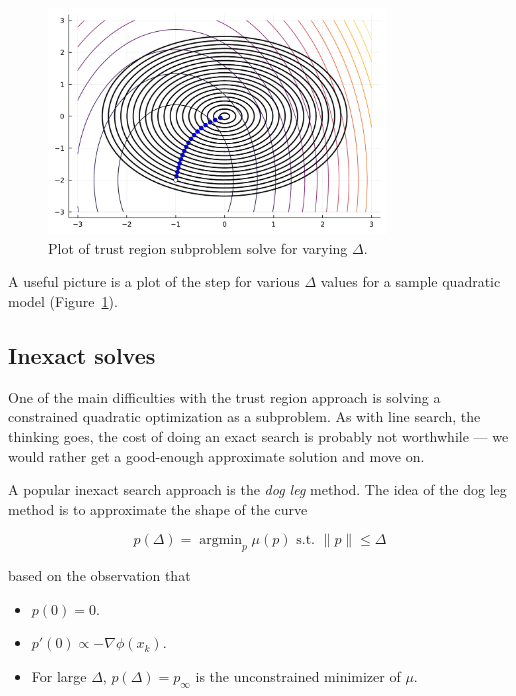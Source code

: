 \documentclass[12pt, leqno]{article} %
\providecommand{\tightlist}{%
  \setlength{\itemsep}{0pt}\setlength{\parskip}{0pt}}
\begin{document}
\begin{figure}
\begin{center}
  \includegraphics[width=0.8\textwidth]{fig/2023-04-19-demo-tr1.pdf}
\end{center}
\caption{Plot of trust region subproblem solve for varying $\Delta$.}
\label{fig:demo-tr1}
\end{figure}

A useful picture is a plot of the step for various $\Delta$ values for
a sample quadratic model (Figure~\ref{fig:demo-tr1}).

\subsection{Inexact solves}

One of the main difficulties with the trust region approach is solving a
constrained quadratic optimization as a subproblem. As with line search,
the thinking goes, the cost of doing an exact search is probably not
worthwhile --- we would rather get a good-enough approximate solution
and move on.

A popular inexact search approach is the \emph{dog leg} method. The idea
of the dog leg method is to approximate the shape of the curve

\[p(\Delta) = \operatorname{argmin}_p \mu(p) \mbox{ s.t. } \|p\| \leq \Delta\]

based on the observation that

\begin{itemize}
\tightlist
\item
  \(p(0) = 0\).
\item
  \(p'(0) \propto -\nabla \phi(x_k)\).
\item
  For large \(\Delta\), \(p(\Delta) = p_{\infty}\) is the unconstrained
  minimizer of \(\mu\).
\end{itemize}
\end{document}
